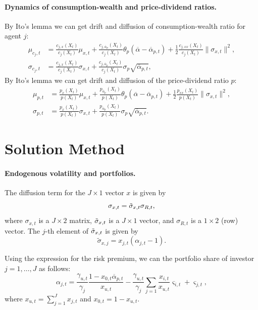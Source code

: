 \paragraph{Dynamics of consumption-wealth and price-dividend ratios.}
By Ito's lemma we can get drift and diffusion of consumption-wealth ratio for agent $ j $:
\begin{align}
	\mu_{c_{j},t}&=\frac{c_{j,x}(X_t)}{c_j(X_t)}\mu_{x,t}+\frac{c_{j,\overline{\alpha}_p}(X_t)}{c_j(X_t)}\theta_p\left(\overline{\alpha}-\overline{\alpha}_{p,t}\right)+\frac{1}{2}\frac{c_{j,xx}(X_t)}{c_j(X_t)}\|\sigma_{x,t}\|^2,\\
	\sigma_{c_j,t}&=\frac{c_{j,x}(X_t)}{c_j(X_t)} \sigma_{x,t} + \frac{c_{j,{\overline{\alpha}_p}}(X_t)}{c_j(X_t)} \sigma_{p} \sqrt{\overline{\alpha}_{p,t}},
\end{align}
By Ito's lemma we can get drift and diffusion of the price-dividend ratio $ p $:
\begin{align}
	\mu_{p,t}&=\frac{p_x(X_t)}{p(X_t)}\mu_{x,t}+\frac{p_{\overline{\alpha}_p}(X_t)}{p(X_t)}\theta_p\left(\overline{\alpha}-\overline{\alpha}_{p,t}\right)+\frac{1}{2}\frac{p_{xx}(X_t)}{p(X_t)}\|\sigma_{x,t}\|^2,\\
	\sigma_{p,t} &= \frac{p_x(X_t)}{p(X_t)} \sigma_{x,t} + \frac{p_{\overline{\alpha}_p}(X_t)}{p(X_t)} \sigma_{p} \sqrt{\overline{\alpha}_{p,t}}. 
\end{align}



\section{Solution Method}

\paragraph{Endogenous volatility and portfolios.} The diffusion term for the $J\times1$ vector $x$ is given by
\begin{equation}
    \sigma_{x,t} = \Tilde{\sigma}_{x,t} \sigma_{R,t},
\end{equation}
where $\sigma_{x,t}$ is a $J\times 2$ matrix, $\Tilde{\sigma}_{x,t}$ is a $J\times 1$ vector, and $\sigma_{R,t}$ is a $1\times 2$ (row) vector. The $j$-th element of $\Tilde{\sigma}_{x,t}$ is given by 
\begin{equation}
    \widetilde{\sigma}_{x,j}=x_{j,t}(\alpha_{j,t}-1).
\end{equation}

Using the expression for the risk premium, we can the portfolio share of investor $j =1,\ldots, J$ as follows:
\begin{equation}
    \alpha_{j,t} = \frac{\gamma_{u,t}}{\gamma_j} \frac{1-x_{0,t} \overline{\alpha}_{p,t}}{x_{u,t}} - \frac{\gamma_{u,t}}{\gamma_j} \sum_{j=1} \frac{x_{i,t}}{x_{u,t}} \varsigma_{i,t} + \varsigma_{j,t},
\end{equation}
where $x_{u,t} = \sum_{j=1}^J x_{j,t} $ and $x_{0,t} = 1-x_{u,t}$.

